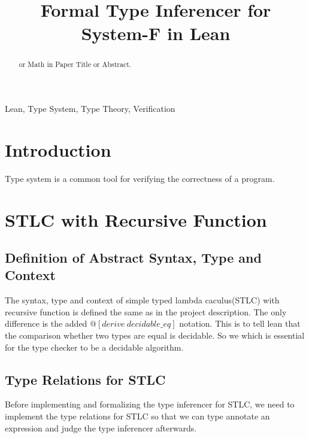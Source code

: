 \documentclass[conference]{IEEEtran}
\begin{document}
\title{Formal Type Inferencer for System-F in Lean
}

\author{
}

\maketitle

\begin{abstract}
	or Math in Paper Title or Abstract.
\end{abstract}

\begin{IEEEkeywords}
	Lean, Type System, Type Theory, Verification
\end{IEEEkeywords}

\section{Introduction}
Type system is a common tool for verifying the correctness of a program.

\section{STLC with Recursive Function}
\subsection{Definition of Abstract Syntax, Type and Context}
The syntax, type and context of simple typed lambda caculus(STLC) with recursive function is defined
the same as in the project description. The only difference is the added $@[derive\ decidable\_eq]$
notation. This is to tell lean that the comparison whether two types are equal is decidable.
So we which is essential for the type checker to be a decidable algorithm.

\subsection{Type Relations for STLC}
Before implementing and formalizing the type inferencer for STLC,
we need to implement the type relations for STLC so that we can
type annotate an expression and judge the type inferencer afterwards.
\end{document}
